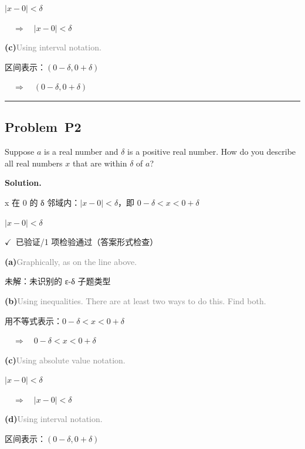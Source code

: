 \documentclass[12pt, a4paper]{article}
\newcommand{\problem}[1]{\subsection*{Problem~#1}}
\newcommand{\solution}{%
  \par\noindent
  {\color{solutiongreen}\bfseries Solution.}\par
}
\newcommand{\verifyok}{\textcolor{solutiongreen}{\ensuremath{\checkmark}\ 已验证}}
\begin{document}
$|x - 0| < \delta$

$\quad\Rightarrow\quad |x - 0| < \delta$

\textbf{(c)}\quad \textcolor{gray}{\small Using interval notation.}

区间表示：$(0 - \delta, 0 + \delta)$

$\quad\Rightarrow\quad (0 - \delta, 0 + \delta)$


\vspace{0.8em}\hrule\vspace{0.8em}

\problem{P2}

\begin{stepbox}
Suppose $a$ is a real number and $\delta$ is a positive real number. How do you describe all real numbers $x$ that are within $\delta$ of $a$?
\end{stepbox}

\solution

\begin{stepbox}
x 在 0 的 δ 邻域内：$|x - 0| < \delta$，即 $0-\delta < x < 0+\delta$
\end{stepbox}

\begin{center}
$\boxed{|x - 0| < \delta}$
\end{center}

\begin{verifybox}\small \verifyok{}/1 项检验通过（答案形式检查） \end{verifybox}

\vspace{0.3em}
\textbf{(a)}\quad \textcolor{gray}{\small Graphically, as on the line above.}

\textcolor{warnamber}{未解：未识别的 ε-δ 子题类型}

\textbf{(b)}\quad \textcolor{gray}{\small Using inequalities. There are at least two ways to do this. Find both.}

用不等式表示：$0 - \delta < x < 0 + \delta$

$\quad\Rightarrow\quad 0 - \delta < x < 0 + \delta$

\textbf{(c)}\quad \textcolor{gray}{\small Using absolute value notation.}

$|x - 0| < \delta$

$\quad\Rightarrow\quad |x - 0| < \delta$

\textbf{(d)}\quad \textcolor{gray}{\small Using interval notation.}

区间表示：$(0 - \delta, 0 + \delta)$
\end{document}
